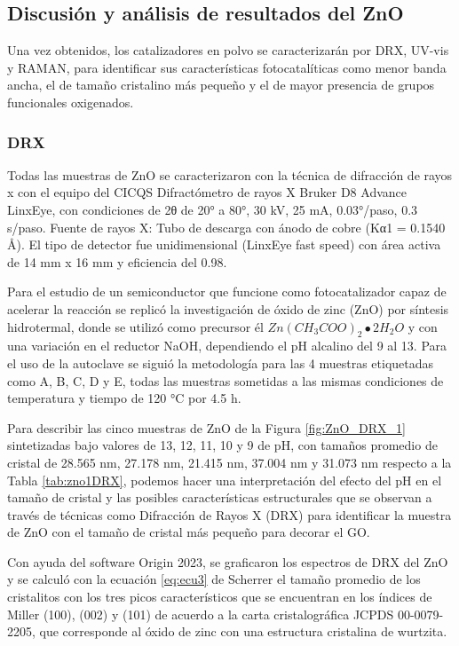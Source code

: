 \documentclass[12pt]{article}
\begin{document}
\subsection{Discusión y análisis de resultados del ZnO}
Una vez obtenidos, los catalizadores en polvo se caracterizarán por DRX, UV-vis y RAMAN, para identificar sus características fotocatalíticas como menor banda ancha, el de tamaño cristalino más pequeño y el de mayor presencia de grupos funcionales oxigenados. 
 \subsubsection{DRX}
 Todas las muestras de ZnO se caracterizaron con la técnica de difracción de rayos x con el equipo del CICQS Difractómetro de rayos X Bruker D8 Advance LinxEye, con condiciones de 2θ de 20° a 80°, 30 kV, 25 mA, 0.03°/paso, 0.3 s/paso. Fuente de rayos X: Tubo de descarga con ánodo de cobre (Kα1 = 0.1540 Å). El tipo de detector fue unidimensional (LinxEye fast speed) con área activa de 14 mm x 16 mm y eficiencia del 0.98.

Para el estudio de un semiconductor que funcione como fotocatalizador capaz de acelerar la reacción  se replicó la investigación de óxido de zinc (ZnO) por síntesis hidrotermal, donde se utilizó como precursor él $\displaystyle Zn( CH_{3} COO)_{2} \smblkcircle 2H_{2}O$  y con una variación en el reductor NaOH, dependiendo el pH alcalino del 9 al 13. Para el uso de la autoclave se siguió la metodología para las 4 muestras etiquetadas como A, B, C, D y E, todas las muestras sometidas a las mismas condiciones de temperatura y tiempo de 120 °C por 4.5 h.\vspace{1em} %

Para describir las cinco muestras de ZnO de la Figura \ref{fig:ZnO_DRX_1} sintetizadas bajo valores de 13, 12, 11, 10 y 9 de pH, con tamaños promedio de cristal de 28.565 nm, 27.178 nm, 21.415 nm, 37.004 nm y 31.073 nm respecto a la Tabla \ref{tab:zno1DRX}, podemos hacer una interpretación del efecto del pH en el tamaño de cristal y las posibles características estructurales que se observan a través de técnicas como Difracción de Rayos X (DRX) para identificar la muestra de ZnO con el tamaño de cristal más pequeño para decorar el GO.\vspace{1em} %


Con ayuda del software Origin 2023, se graficaron los espectros de DRX del ZnO y se calculó con la ecuación \ref{eq:ecu3} de Scherrer el tamaño promedio de los cristalitos con los tres picos característicos que se encuentran en los índices de Miller (100), (002) y (101) de acuerdo a la carta cristalográfica JCPDS 00-0079-2205, que corresponde al óxido de zinc con una estructura cristalina de wurtzita.
\end{document}
